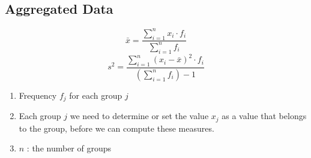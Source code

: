 \subsection{Aggregated Data \cite{ism-1}}\label{Aggregated Data}
\[
    \bar{x} = \displaystyle\dfrac{\sum_{i=1}^{n} x_i \cdot f_i}{\sum_{i=1}^{n} f_i}
\]
\[
    s^2 = \displaystyle\dfrac{\sum_{i=1}^{n} (x_i - \bar{x})^2 \cdot f_i}{\left( \sum_{i=1}^{n} f_i \right) - 1}
\]

\begin{enumerate}
    \item Frequency $f_j$ for each group $j$
    \item Each group $j$ we need to determine or set the value $x_j$ as a value that belongs to the group, before we can compute these measures.
    \item $n$ : the number of groups
\end{enumerate}





















